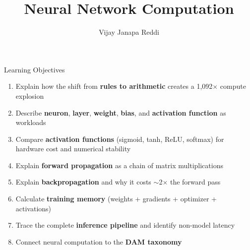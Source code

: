\documentclass[aspectratio=169, 12pt]{beamer}
\title{Neural Network Computation}
\author{Vijay Janapa Reddi}
\institute{Harvard University}
\date{}
\newcommand{\DAM}{D\raisebox{0.08em}{\tiny$\bullet$}A\raisebox{0.08em}{\tiny$\bullet$}M}
\begin{document}

\begin{frame}{Learning Objectives}

\footnotesize
\begin{enumerate}\setlength\itemsep{0pt}
  \item Explain how the shift from \textbf{rules to arithmetic} creates a 1,092$\times$ compute explosion
  \item Describe \textbf{neuron}, \textbf{layer}, \textbf{weight}, \textbf{bias}, and \textbf{activation function} as workloads
  \item Compare \textbf{activation functions} (sigmoid, tanh, ReLU, softmax) for hardware cost and numerical stability
  \item Explain \textbf{forward propagation} as a chain of matrix multiplications
  \item Explain \textbf{backpropagation} and why it costs $\sim$2$\times$ the forward pass
  \item Calculate \textbf{training memory} (weights + gradients + optimizer + activations)
  \item Trace the complete \textbf{inference pipeline} and identify non-model latency
  \item Connect neural computation to the \textbf{\DAM{} taxonomy}
\end{enumerate}

\end{frame}
\end{document}
